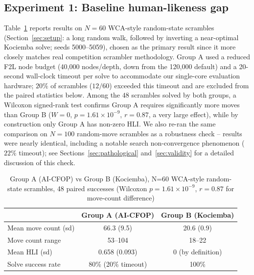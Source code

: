 \documentclass[10pt,conference]{article}
\begin{document}
\subsection{Experiment 1: Baseline human-likeness gap}
Table~\ref{tab:exp1} reports results on $N=60$ WCA-style random-state
scrambles (Section~\ref{sec:setup}: a long random walk, followed by
inverting a near-optimal Kociemba solve; seeds 5000--5059), chosen as
the primary result since it more closely matches real competition
scrambler methodology. Group A used a reduced F2L node budget
(40{,}000 nodes/depth, down from the 120{,}000 default) and a
20-second wall-clock timeout per solve to accommodate our single-core
evaluation hardware; $20\%$ of scrambles ($12/60$) exceeded this
timeout and are excluded from the paired statistics below. Among the
$48$ scrambles solved by both groups, a Wilcoxon signed-rank test
confirms Group A requires significantly more moves than Group B
($W=0$, $p=1.61\times10^{-9}$, $r=0.87$, a very large effect), while by
construction only Group A has non-zero HLI. We also re-ran the same
comparison on $N=100$ random-move scrambles as a robustness check --
results were nearly identical, including a notable search
non-convergence phenomenon ($22\%$ timeout); see
Sections~\ref{sec:pathological} and~\ref{sec:validity} for a detailed
discussion of this check.

\begin{table}[h]
\centering
\caption{Group A (AI-CFOP) vs Group B (Kociemba), N=60 WCA-style
random-state scrambles, 48 paired successes (Wilcoxon
$p=1.61\times10^{-9}$, $r=0.87$ for move-count difference)}
\begin{tabular}{lcc}
\toprule
 & Group A (AI-CFOP) & Group B (Kociemba) \\
\midrule
Mean move count (sd) & 66.3 (9.5) & 20.6 (0.9) \\
Move count range & 53--104 & 18--22 \\
Mean HLI (sd) & 0.658 (0.093) & 0 (by definition) \\
Solve success rate & 80\% (20\% timeout) & 100\% \\
\bottomrule
\end{tabular}
\label{tab:exp1}
\end{table}
\end{document}
